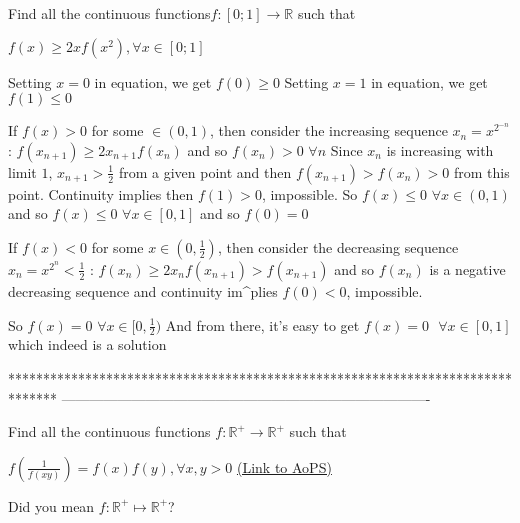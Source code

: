 \begin{solution}
	\begin{tcolorbox}Find all the continuous functions$  f: [ 0;1  ]\rightarrow \mathbb{R}    $ such  that

$f ( x  )\geq 2xf ( x^{2}) ,\forall x\in  [ 0;1  ]$\end{tcolorbox}
Setting $x=0$ in equation, we get $f(0)\ge 0$
Setting $x=1$ in equation, we get $f(1)\le 0$

If $f(x)>0$ for some $\in(0,1)$, then consider the increasing sequence $x_n=x^{2^{-n}}$ :
$f(x_{n+1})\ge 2x_{n+1}f(x_n)$ and so $f(x_n)>0$ $\forall n$
Since $x_n$ is increasing with limit $1$, $x_{n+1}>\frac 12$ from a given point and then $f(x_{n+1})>f(x_n)>0$ from this point.
Continuity implies then $f(1)>0$, impossible. 
So $f(x)\le 0$ $\forall x\in(0,1)$ and so $f(x)\le 0$ $\forall x\in[0,1]$ and so $f(0)=0$

If $f(x)<0$ for some $x\in(0,\frac 12)$,  then consider the decreasing sequence $x_n=x^{2^{n}}<\frac 12$ :
$f(x_n)\ge 2x_nf(x_{n+1})>f(x_{n+1})$  and so $f(x_n)$ is a negative decreasing sequence and continuity im^plies $f(0)<0$, impossible.

So $f(x)=0$ $\forall x\in[0,\frac 12)$
And from there, it's easy to get $\boxed{f(x)=0\text{  }\forall x\in[0,1]}$ which indeed is a solution
\end{solution}
*******************************************************************************
-------------------------------------------------------------------------------

\begin{problem}
	Find all the continuous functions $f:\mathbb{R}^{+}\rightarrow \mathbb{R}^{+} $ such that  

$f\left (\frac{1}{f\left ( xy \right )}  \right )=f(x)f(y),\forall x,y> 0$
	\flushright \href{https://artofproblemsolving.com/community/c6h618481}{(Link to AoPS)}
\end{problem}



\begin{solution}
	Did you mean $ f :\mathbb{R}^+\mapsto\mathbb{R}^+ $?
\end{solution}



